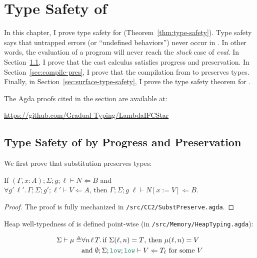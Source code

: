 \chapter{Type Safety of \Surface}
\label{ch:type-safety}


In this chapter, I prove type safety for \Surface
(Theorem~\ref{thm:type-safety}). Type safety says that untrapped errors (or
``undefined behaviors'') never occur in \Surface. In other words, the evaluation
of a \Surface program will never reach the \textit{stuck} case of \textit{eval}.
In Section~\ref{sec:cc-type-safety}, I prove that the cast calculus \CC
satisfies progress and preservation. In Section~\ref{sec:compile-pres}, I prove
that the compilation from \Surface to \CC preserves types. Finally, in
Section~\ref{sec:surface-type-safety}, I prove the type safety theorem for
\Surface.

The Agda proofs cited in the section are available at:
\begin{center}
  \url{https://github.com/Gradual-Typing/LambdaIFCStar}
\end{center}


\section{Type Safety of \CC by Progress and Preservation}
\label{sec:cc-type-safety}

We first prove that substitution preserves types:

\begin{lemma}
  \label{lem:subst-pres}
  If $(\Gamma,x{:}A);\Sigma;g;\ell\vdash N \Leftarrow B$ and \\
  $\forall g'\,\ell'.\,\Gamma;\Sigma;g';\ell' \vdash V \Leftarrow A$, then
  $\Gamma;\Sigma;g\;\ell \vdash N[x:=V] \Leftarrow B$.
\end{lemma}
\begin{proof}
  The proof is fully mechanized in \texttt{/src/CC2/SubstPreserve.agda}.
\end{proof}

Heap well-typedness of \CC is defined point-wise (in
\texttt{/src/Memory/HeapTyping.agda}):

\begin{align*}
  \Sigma \vdash \mu \triangleq & \forall n\,\ell\,T.\,\text{if}~\Sigma(\ell,n)=T \text{, then}~\mu(\ell,n)=V \\
  & \text{and}~\emptyset;\Sigma;\low;\low\vdash V \Leftarrow T_{\ell} ~\text{for some}~ V
\end{align*}

